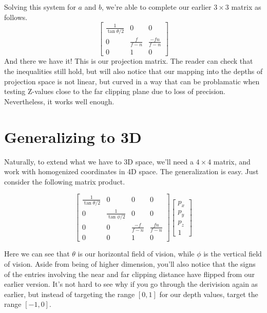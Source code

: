 \documentclass[12pt]{article}
\begin{document}
Solving this system for $a$ and $b$, we're able to complete our earlier $3\times 3$ matrix as follows.
\begin{equation*}
\left[
\begin{array}{ccc}
\frac{1}{\tan\theta/2} & 0 & 0 \\
0 & \frac{f}{f-n} & \frac{-fn}{f-n} \\
0 & 1 & 0
\end{array}
\right]
\end{equation*}
And there we have it!  This is our projection matrix.  The reader can check that the inequalities still hold, but will also notice that our mapping into the depths of projection space is not linear, but curved in a way that can be problamatic when testing Z-values close to the far clipping plane due to loss of precision.  Nevertheless, it works well enough.

\section*{Generalizing to 3D}

Naturally, to extend what we have to 3D space, we'll need a $4\times 4$ matrix, and work with homogenized coordinates in 4D space.  The generalization is easy.  Just consider the following matrix product.

\begin{equation*}
\left[
\begin{array}{cccc}
\frac{1}{\tan\theta/2} & 0 & 0 & 0 \\
0 & \frac{1}{\tan\phi/2} & 0 & 0 \\
0 & 0 & \frac{-f}{f-n} & \frac{fn}{f-n} \\
0 & 0 & 1 & 0
\end{array}
\right]\left[
\begin{array}{c}
p_x \\
p_y \\
p_z \\
1
\end{array}
\right]
\end{equation*}

Here we can see that $\theta$ is our horizontal field of vision, while $\phi$ is the vertical field of vision.  Aside from being of higher dimension, you'll also notice that the signs of the entries involving the near and far clipping distance have flipped from our earlier version.  It's not hard to see why if you go through the derivision again as earlier, but instead of targeting the range $[0,1]$ for our depth values, target the range $[-1,0]$.
\end{document}

